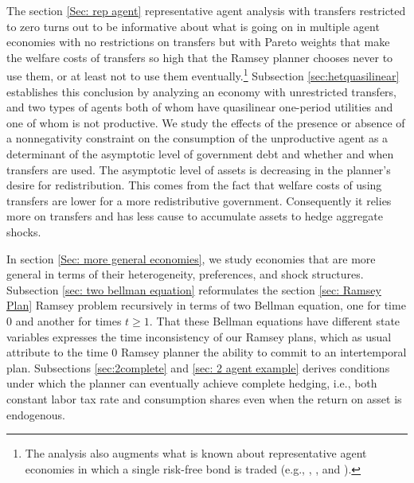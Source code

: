 \documentclass[thmsb,11pt]{article}
\begin{document}
 The section   \ref{Sec: rep agent} representative agent analysis with transfers restricted to zero
  turns out to be   informative about what is going on in multiple agent economies with no restrictions on transfers but with Pareto weights that make
     the welfare  costs of transfers so  high that the Ramsey planner chooses never to use them, or at least not to use them
     eventually.\footnote{The analysis
also  augments what is known about representative agent economies in which a single  risk-free bond is traded (e.g., \citet{Aiyagari2002}, \citet{Farhi2010},
and \citet{Faraglia2011}).}
Subsection \ref{sec:hetquasilinear} establishes this conclusion by analyzing an economy with  unrestricted transfers, and two types of agents both of whom
 have quasilinear one-period utilities and one of whom is not productive. We study the effects of the presence or absence of  a nonnegativity constraint on the consumption of the unproductive agent as a determinant of the asymptotic level of government debt and  whether and when transfers are used.
The asymptotic level of assets is decreasing in the planner's desire for redistribution.
This comes from the fact that welfare costs of using transfers are lower for a more redistributive government.
Consequently it relies more on transfers and has less cause to accumulate assets to hedge aggregate shocks.



%
%
%

 In section \ref{Sec: more general economies},
we study economies that are more general in terms of their  heterogeneity, preferences, and shock structures.  Subsection
\ref{sec: two bellman equation} reformulates  the section \ref{sec: Ramsey Plan} Ramsey problem recursively in terms of two Bellman equation,
one for time $0$ and another for times $t\geq 1$.  That these Bellman equations have different state variables expresses the time inconsistency
of our Ramsey plans, which as usual attribute to the time $0$ Ramsey planner the ability to commit to an intertemporal plan.
Subsections \ref{sec:2complete} and \ref{sec: 2 agent example}   derives conditions under which the planner can eventually
achieve complete hedging, i.e., both constant labor tax rate and consumption shares even when the return on asset is endogenous.
\end{document}
